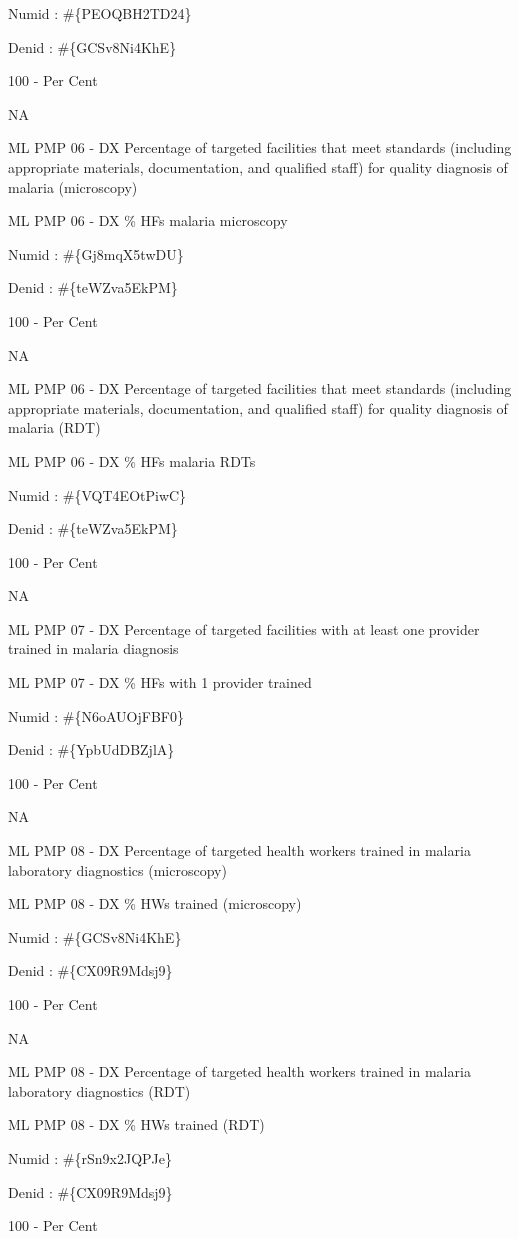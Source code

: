 \documentclass[]{book}
\begin{document}
Numid : \#\{PEOQBH2TD24\}

Denid : \#\{GCSv8Ni4KhE\}

100 - Per Cent

NA

ML PMP 06 - DX Percentage of targeted facilities that meet standards (including appropriate materials, documentation, and qualified staff) for quality diagnosis of malaria (microscopy)

ML PMP 06 - DX \% HFs malaria microscopy

Numid : \#\{Gj8mqX5twDU\}

Denid : \#\{teWZva5EkPM\}

100 - Per Cent

NA

ML PMP 06 - DX Percentage of targeted facilities that meet standards (including appropriate materials, documentation, and qualified staff) for quality diagnosis of malaria (RDT)

ML PMP 06 - DX \% HFs malaria RDTs

Numid : \#\{VQT4EOtPiwC\}

Denid : \#\{teWZva5EkPM\}

100 - Per Cent

NA

ML PMP 07 - DX Percentage of targeted facilities with at least one provider trained in malaria diagnosis

ML PMP 07 - DX \% HFs with 1 provider trained

Numid : \#\{N6oAUOjFBF0\}

Denid : \#\{YpbUdDBZjlA\}

100 - Per Cent

NA

ML PMP 08 - DX Percentage of targeted health workers trained in malaria laboratory diagnostics (microscopy)

ML PMP 08 - DX \% HWs trained (microscopy)

Numid : \#\{GCSv8Ni4KhE\}

Denid : \#\{CX09R9Mdsj9\}

100 - Per Cent

NA

ML PMP 08 - DX Percentage of targeted health workers trained in malaria laboratory diagnostics (RDT)

ML PMP 08 - DX \% HWs trained (RDT)

Numid : \#\{rSn9x2JQPJe\}

Denid : \#\{CX09R9Mdsj9\}

100 - Per Cent
\end{document}
